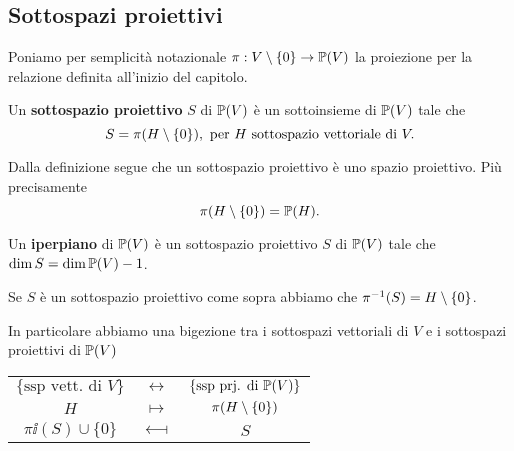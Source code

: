 \begin{multicols*}{2}
    \subsection{Sottospazi proiettivi}

    Poniamo per semplicit\`a notazionale $\pi:V\setminus\{0\}\to{\mathbb{P}(V)}$ la proiezione per la relazione definita all'inizio del capitolo.


    \begin{definition}
        Un \textbf{sottospazio proiettivo} $S$ di ${\mathbb{P}(V)}$ \`e un sottoinsieme di ${\mathbb{P}(V)}$ tale che
        \[S=\pi(H\setminus\{0\}),\text{ per }H\text{ sottospazio vettoriale di }V.\]
    \end{definition}
    \begin{remark}
    Dalla definizione segue che un sottospazio proiettivo \`e uno spazio proiettivo. Pi\`u precisamente \[\pi(H\setminus\{0\})=\mathbb{P}(H).\]
    \end{remark}
    \begin{definition}
    Un \textbf{iperpiano} di ${\mathbb{P}(V)}$ \`e un sottospazio proiettivo $S$ di ${\mathbb{P}(V)}$ tale che $\dim S=\dim {\mathbb{P}(V)}-1$.
    \end{definition}

    \begin{proposition}
    Se $S$ \`e un sottospazio proiettivo come sopra abbiamo che $\pi^{-1}(S)=H\setminus\{0\}$.
    \bigskip

    \noindent
    In particolare abbiamo una bigezione tra i sottospazi vettoriali di $V$ e i sottospazi proiettivi di ${\mathbb{P}(V)}$
    \begin{center}
    \begin{tabular}{ccc}
    $\{\text{ssp vett. di }V\}$ & $\longleftrightarrow$ & $\{\text{ssp prj. di }{\mathbb{P}(V)}\}$ \\
    $H$ & $\longmapsto$ & $\pi(H\setminus\{0\})$\\
    $\pi\ii(S)\cup\{0\}$ & $\longmapsfrom$ & $S$
    \end{tabular}
    \end{center}
    \end{proposition}



\end{multicols*}
